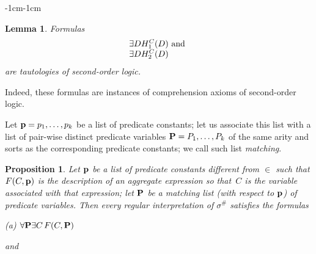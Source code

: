 \documentclass[11pt]{article}
\newtheorem{proposition}{Proposition}
\newtheorem{lemma}{Lemma}
\def\ba{\begin{array}}
\def\ea{\end{array}}
\begin{document}
\begin{adjustwidth}{-1cm}{-1cm}
\begin{lemma}\label{lem:privatedefs2}
  Formulas
  $$
  \ba{l}
  \exists D H^C_1(D) \hbox{ and }\\
  \exists D H^C_2(D)\\
  \ea
  $$
  are tautologies of second-order logic. %
\end{lemma}

\noindent
Indeed, these formulas are instances of comprehension axioms of second-order logic.

Let ${\bf p}=p_1,\dots,p_k$ be a list of predicate constants; 
let
us associate this list with a list of pair-wise distinct predicate variables ${\bf P}=P_1,\dots,P_k$ of the same arity and sorts as the corresponding predicate constants; we call such list {\em matching}. 


\begin{proposition}\label{lem:eu-verygeneral}
 Let ${\bf p}$ be a list of predicate constants different from $\in$ such that 
$F(C,\bf p)$  is the description of an aggregate expression so that~$C$ is the variable associated with that expression; 
let ${\bf P}$  be a matching list (with respect to ${\bf p}$) of predicate variables. Then  
  every regular interpretation of $\sigma^\#$ satisfies the formulas
 \medskip
 
 (a) $\forall {\bf P} \exists C\,F(C,\bf P)$

 \medskip\noindent and


\end{proposition}
\end{adjustwidth}
\end{document}

